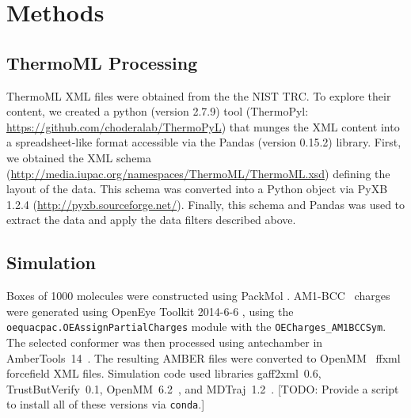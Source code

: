 \documentclass[aps,pre,twocolumn,nofootinbib,superscriptaddress,linenumbers]{revtex4-1}
\begin{document}

\section{Methods}

\subsection{ThermoML Processing}

ThermoML XML files were obtained from the the NIST TRC.  To explore their content, we created a python (version 2.7.9) tool (ThermoPyl: \url{https://github.com/choderalab/ThermoPyL}) that munges the XML content into a spreadsheet-like format accessible via the  Pandas (version 0.15.2) library.  
First, we obtained the XML schema (\url{http://media.iupac.org/namespaces/ThermoML/ThermoML.xsd}) defining the layout of the data.  
This schema was converted into a Python object via PyXB 1.2.4 (\url{http://pyxb.sourceforge.net/}).  
Finally, this schema and Pandas was used to extract the data and apply the data filters described above.  

\subsection{Simulation}
Boxes of 1000 molecules were constructed using PackMol \cite{martinez2009packmol}. 
AM1-BCC~\cite{am1bcc1,am1bcc2} charges were generated using OpenEye Toolkit 2014-6-6 \cite{openeye}, using the {\tt oequacpac.OEAssignPartialCharges} module with the {\tt OECharges\_AM1BCCSym}.  
The selected conformer was then processed using antechamber in AmberTools~14~\cite{amber14}.  
The resulting AMBER files were converted to OpenMM~\cite{eastman2012openmm} ffxml forcefield XML files.  
Simulation code used libraries gaff2xml~0.6, TrustButVerify~0.1, OpenMM~6.2~\cite{eastman2012openmm}, and MDTraj~1.2~\cite{mcgibbon2014mdtraj}.  
{\color{red}[TODO: Provide a script to install all of these versions via {\tt conda}.]}
\end{document}

